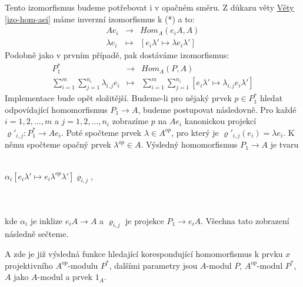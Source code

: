       Tento izomorfismus budeme potřebovat i v opačném směru. Z důkazu věty 
      \hyperref[izo-hom-aei]{Věty \ref*{izo-hom-aei}} máme inverzní 
      izomorfismus k (*) a to:
      \begin{eqnarray}
        Ae_i &\to& Hom_A(e_iA,A) \nonumber \\
        \lambda e_i &\mapsto& [e_i\lambda'\mapsto \lambda e_i\lambda']  \nonumber
      \end{eqnarray}
      Podobně jako v prvním případě, pak dostáváme izomorfismus:
      \begin{eqnarray}
        P_1^* &\to& Hom_A(P,A) \nonumber \\
        \sum_{i=1}^m\sum_{j=1}^{n_i} \lambda_{i,j} e_i &\mapsto& \sum_{i=1}^m\sum_{j=1}^{n_i} [e_i\lambda'\mapsto \lambda_{i,j} e_i\lambda']  \nonumber      
      \end{eqnarray}
      Implementace bude opět složitější.
      Budeme-li pro nějaký prvek $p\in P_1^*$ hledat odpovídající homomorfismus $P_1\to A$, budeme postupovat
      následovně. Pro každé $i=1,2,\ldots,m$ a $j=1,2,\ldots,n_i$ zobrazíme $p$ na $Ae_i$ 
      kanonickou projekcí $\varrho'_{i,j}:P_1^*\to Ae_i$. Poté spočteme prvek $\lambda\in A^{op}$, pro 
      který je $\varrho'_{i,j}(e_i)=\lambda e_i$. K němu spočteme opačný prvek $\lambda^{op}\in 
      A$. Výsledný homomorfismus $P_1\to A$ je tvaru \\\\
      \centerline{$\alpha_i[e_i\lambda'\mapsto e_i\lambda^{op}\lambda']\varrho_{i,j}$,}\\\\
      kde $\alpha_i$ je inklize $e_iA\to A$ a $\varrho_{i,j}$ je projekce $P_1\to e_iA$. 
      Všechna tato zobrazení následně sečteme.

      A zde je již výsledná funkce hledající korespondující homomorfismus 
      k prvku $x$ projektivního $A^{op}$-modulu $P^*$,
      dalšími parametry jsou $A$-modul $P$, $A^{op}$-modul $P^*$, $A$ jako 
      $A$-modul a prvek $1_A$.\\
     
